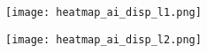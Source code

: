       

      \begin{figure}
        \centering
        \begin{subfigure}[b]{0.45\textwidth}
          \texttt{[image: heatmap\_ai\_disp\_l1.png]}
          \caption{}
          \label{fig:heatmap_ai_disp_l1}
        \end{subfigure}
        \begin{subfigure}[b]{0.45\textwidth}
          \texttt{[image: heatmap\_ai\_disp\_l2.png]}
          \caption{}
          \label{fig:heatmap_ai_disp_l2}
        \end{subfigure}
        \caption{}
        \label{fig:heatmap_ai_disp}
      \end{figure}
      
